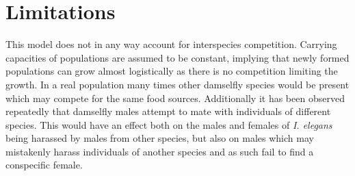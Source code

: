 \documentclass[10pt,letterpaper]{article}
\begin{document}
\section{Limitations}
This model does not in any way account for interspecies competition. Carrying capacities of populations are assumed to be constant, implying that newly formed populations can grow almost logistically as there is no competition limiting the growth. In a real population many times other damselfly species would be present which may compete for the same food sources. Additionally it has been observed repeatedly that damselfly males attempt to mate with individuals of different species. This would have an effect both on the males and females of \textit{I. elegans} being harassed by males from other species, but also on males which may mistakenly harass individuals of another species and as such fail to find a conspecific female.


\end{document}
